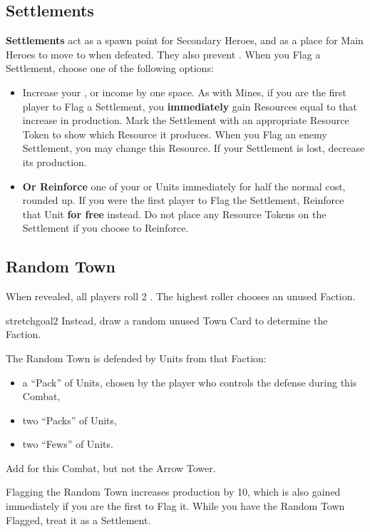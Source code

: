 \begin{multicols}{2}
\subsection*{Settlements}
\textbf{Settlements} act as a spawn point for Secondary Heroes, and as a place for Main Heroes to move to when defeated.
They also prevent .
When you Flag a Settlement, choose one of the following options:
\begin{itemize}
  \item Increase your ,  or  income by one space.
    As with Mines, if you are the first player to Flag a Settlement, you \textbf{immediately} gain Resources equal to that increase in production.
      Mark the Settlement with an appropriate Resource Token to show which Resource it produces.
      When you Flag an enemy Settlement, you may change this Resource.
      If your Settlement is lost, decrease its production.
  \item \textbf{Or Reinforce} one of your  or  Units immediately for half the normal cost, rounded up.
    If you were the first player to Flag the Settlement, Reinforce that Unit \textbf{for free} instead.
    Do not place any Resource Tokens on the Settlement if you choose to Reinforce.
\end{itemize}

\vspace*{\fill}
\columnbreak

\subsection*{Random Town}

\bigskip
When revealed, all players roll 2 .
The highest roller chooses an unused Faction.
\begin{expansion}{stretchgoal2}
  Instead, draw a random unused Town Card to determine the Faction.
\end{expansion}
The Random Town is defended by Units from that Faction:
\begin{itemize}
  \item a ``Pack'' of  Units, chosen by the player who controls the defense during this Combat,
  \item two ``Packs'' of  Units,
  \item two ``Fews'' of  Units.
\end{itemize}
Add  for this Combat, but not the Arrow Tower.

Flagging the Random Town increases  production by 10, which is also gained immediately if you are the first to Flag it.
While you have the Random Town Flagged, treat it as a Settlement.

\end{multicols}
\vspace*{\fill}

